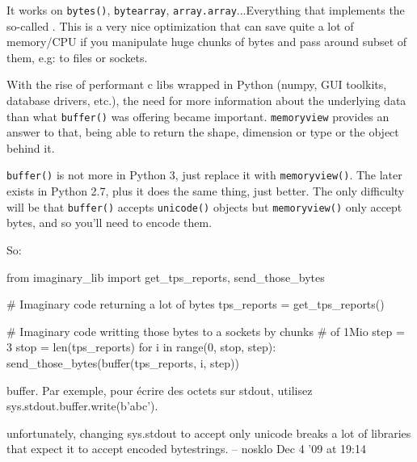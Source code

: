 It works on \lstinline{bytes()}, \lstinline{bytearray}, \lstinline{array.array}...Everything that implements the so-called . This is a very nice optimization that can save quite a lot of memory/CPU if you manipulate huge chunks of bytes and pass around subset of them, e.g: to files or sockets.

With the rise of performant c libs wrapped in Python (numpy, GUI toolkits, database drivers, etc.), the need for more information about the underlying data than what \lstinline{buffer()} was offering became important. \lstinline{memoryview} provides an answer to that, being able to return the shape, dimension or type or the object behind it.

\lstinline{buffer()} is not more in Python 3, just replace it with \lstinline{memoryview()}. The later exists in Python 2.7, plus it does the same thing, just better. The only difficulty will be that \lstinline{buffer()} accepts \lstinline{unicode()} objects but \lstinline{memoryview()} only accept bytes, and so you'll need to encode them.

So:

\begin{py2}
from imaginary_lib import get_tps_reports, send_those_bytes

# Imaginary code returning a lot of bytes
tps_reports = get_tps_reports()

# Imaginary code writting those bytes to a sockets by chunks
# of 1Mio
step = 3
stop = len(tps_reports)
for i in range(0, stop, step):
    send_those_bytes(buffer(tps_reports, i, step))

\end{py2}






buffer. Par exemple, pour écrire des octets sur stdout, utilisez sys.stdout.buffer.write(b'abc').

unfortunately, changing sys.stdout to accept only unicode breaks a lot of libraries that expect it to accept encoded bytestrings. – nosklo Dec 4 '09 at 19:14
